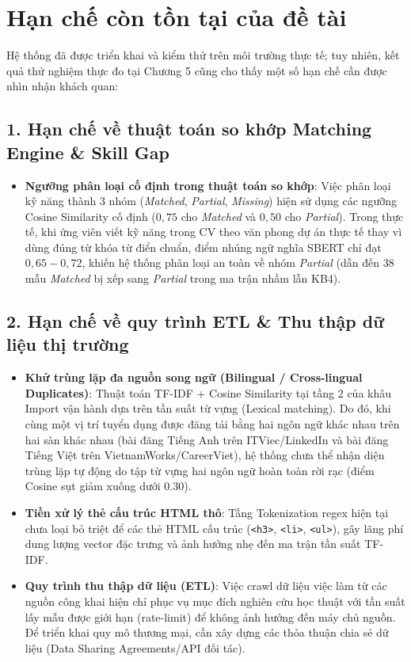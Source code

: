 
\section{Hạn chế còn tồn tại của đề tài}

Hệ thống đã được triển khai và kiểm thử trên môi trường thực tế; tuy nhiên, kết quả thử nghiệm thực đo tại Chương 5 cũng cho thấy một số hạn chế cần được nhìn nhận khách quan:

\subsection*{1. Hạn chế về thuật toán so khớp Matching Engine \& Skill Gap}
\begin{itemize}
    \item \textbf{Ngưỡng phân loại cố định trong thuật toán so khớp}: Việc phân loại kỹ năng thành 3 nhóm (\textit{Matched}, \textit{Partial}, \textit{Missing}) hiện sử dụng các ngưỡng Cosine Similarity cố định ($0{,}75$ cho \textit{Matched} và $0{,}50$ cho \textit{Partial}). Trong thực tế, khi ứng viên viết kỹ năng trong CV theo văn phong dự án thực tế thay vì dùng đúng từ khóa từ điển chuẩn, điểm nhúng ngữ nghĩa SBERT chỉ đạt $0{,}65 - 0{,}72$, khiến hệ thống phân loại an toàn về nhóm \textit{Partial} (dẫn đến 38 mẫu \textit{Matched} bị xếp sang \textit{Partial} trong ma trận nhầm lẫn KB4).
\end{itemize}

\subsection*{2. Hạn chế về quy trình ETL \& Thu thập dữ liệu thị trường}
\begin{itemize}
    \item \textbf{Khử trùng lặp đa nguồn song ngữ (Bilingual / Cross-lingual Duplicates)}: Thuật toán TF-IDF + Cosine Similarity tại tầng 2 của khâu Import vận hành dựa trên tần suất từ vựng (Lexical matching). Do đó, khi cùng một vị trí tuyển dụng được đăng tải bằng hai ngôn ngữ khác nhau trên hai sàn khác nhau (bài đăng Tiếng Anh trên ITViec/LinkedIn và bài đăng Tiếng Việt trên VietnamWorks/CareerViet), hệ thống chưa thể nhận diện trùng lặp tự động do tập từ vựng hai ngôn ngữ hoàn toàn rời rạc (điểm Cosine sụt giảm xuống dưới 0.30).
    \item \textbf{Tiền xử lý thẻ cấu trúc HTML thô}: Tầng Tokenization regex hiện tại chưa loại bỏ triệt để các thẻ HTML cấu trúc (\texttt{<h3>}, \texttt{<li>}, \texttt{<ul>}), gây lãng phí dung lượng vector đặc trưng và ảnh hưởng nhẹ đến ma trận tần suất TF-IDF.
    \item \textbf{Quy trình thu thập dữ liệu (ETL)}: Việc crawl dữ liệu việc làm từ các nguồn công khai hiện chỉ phục vụ mục đích nghiên cứu học thuật với tần suất lấy mẫu được giới hạn (rate-limit) để không ảnh hưởng đến máy chủ nguồn. Để triển khai quy mô thương mại, cần xây dựng các thỏa thuận chia sẻ dữ liệu (Data Sharing Agreements/API đối tác).
\end{itemize}

